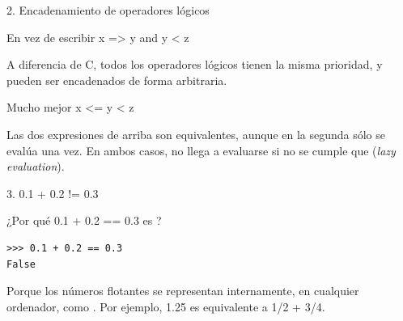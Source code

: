 \documentclass[14pt]{beamer}
\begin{document}
\begin{frame}{2. \large Encadenamiento de operadores lógicos}
  \begin{alertblock}{En vez de escribir}
    \centering \LARGE x => y and y < z
  \end{alertblock}

  \small
  \begin{center}
    A diferencia de C, todos los operadores lógicos tienen la misma
    prioridad, y pueden ser encadenados de forma arbitraria.
  \end{center}

  \begin{block}{Mucho mejor}
    \centering \LARGE x <= y < z
  \end{block}

  \small
  \begin{center}
    Las dos expresiones de arriba son equivalentes, aunque en la
    segunda  sólo se evalúa una vez. En ambos casos,
     no llega a evaluarse si no se cumple que
     (\emph{lazy evaluation}).
  \end{center}
\end{frame}

\begin{frame}[fragile]{3. 0.1 + 0.2 != 0.3}
  \begin{alertblock}{}
    \centering \Large ¿Por qué 0.1 + 0.2 == 0.3 es ?
  \end{alertblock}

  \begin{exampleblock}{}
    \begin{lstlisting}
>>> 0.1 + 0.2 == 0.3
False
    \end{lstlisting}
  \end{exampleblock}

  \begin{center}
    Porque los números flotantes se representan internamente, en
    cualquier ordenador, como . Por
    ejemplo, 1.25 es equivalente a 1/2 + 3/4.
  \end{center}
\end{frame}
\end{document}
